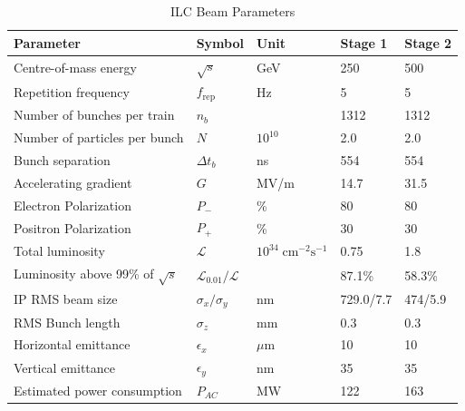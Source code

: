 \begin{table}
\caption[ILC Beam Parameters]{ILC Beam Parameters\cite{ILCTDR}}
\label{table:ilcbeamparameters}
\centering
\begin{tabular}{l l l l l }
\toprule
\textbf{Parameter}                  & \textbf{Symbol}         & \textbf{Unit}& \textbf{Stage 1} & \textbf{Stage 2} \\
\midrule
Centre-of-mass energy               & $\sqrt{s}$                &GeV                                        & 250 & 500 \\
Repetition frequency                & $f_{\text{rep}}$        &Hz                                         & 5 & 5 \\
Number of bunches per train         & $n_{b}$                 &                                           & 1312 & 1312 \\
Number of particles per bunch                    & $N$                     &$10^{10}$                      & 2.0 & 2.0 \\
Bunch separation                    & $\Delta t_b$             &ns                                         & 554 & 554 \\
\midrule
Accelerating gradient               & $G$                     &MV/m                                       & 14.7 & 31.5 \\
Electron Polarization               & $P_-$                   &\%                                       & 80 & 80 \\
Positron Polarization               & $P_+$                   &\%                                       & 30 & 30 \\
\midrule
Total luminosity                    & $\mathcal{L}$           &$10^{34}\;\text{cm}^{-2}\text{s}^{-1}$     & 0.75 & 1.8 \\
Luminosity above 99\% of $\sqrt{s}$   & $\mathcal{L}_{0.01}/\mathcal{L}$    &                            & 87.1\% & 58.3\% \\
\midrule
IP RMS beam size                    & $\sigma_x/\sigma_y$     &nm                                         & 729.0/7.7 & 474/5.9 \\
RMS Bunch length                    & $\sigma_z$              &mm                                  & 0.3 & 0.3 \\
Horizontal emittance                & $\epsilon_x$            &$\mu$m                                     & 10  & 10 \\
Vertical emittance                  & $\epsilon_y$            &nm                                         & 35 & 35 \\
Estimated power consumption         & $P_{AC}$                &MW                                & 122    & 163   \\
\bottomrule
\end{tabular}
\end{table}

